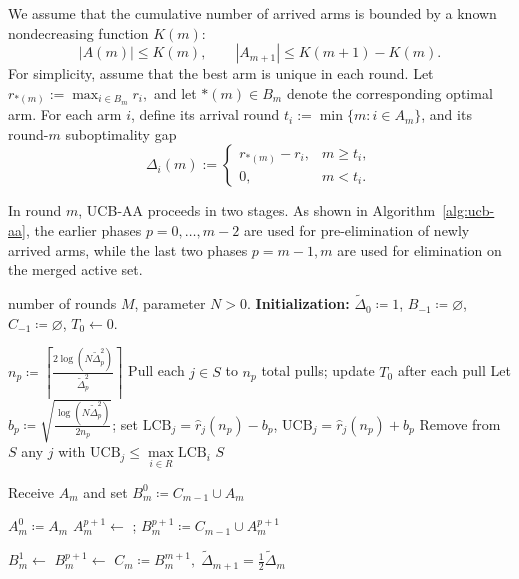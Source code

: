 \documentclass[11pt]{article}
\begin{document}
We assume that the cumulative number of arrived arms is bounded by a known nondecreasing
function \(K(m)\):
\[
|A(m)| \le K(m), \qquad |A_{m+1}| \le K(m+1)-K(m).
\]
For simplicity, assume that the best arm is unique in each round. Let
\(
r_{*(m)}:=\max_{i\in B_m} r_i,
\)
and let \(*(m)\in B_m\) denote the corresponding optimal arm. For each arm \(i\), define
its arrival round $t_i:=\min\{m:i\in A_m\}$, and its round-\(m\) suboptimality gap
\[
\Delta_i(m):=
\begin{cases}
r_{*(m)}-r_i, & m\ge t_i,\\
0, & m<t_i.
\end{cases}
\]




In round $m$, UCB-AA proceeds in two stages. As shown in Algorithm~\ref{alg:ucb-aa}, the earlier phases $p=0,\ldots,m-2$ are used for pre-elimination of newly arrived arms, while the last two phases $p=m-1,m$ are used for elimination on the merged active set. 


\begin{algorithm}[H]
\caption{\textbf{UCB for Arriving Arms (UCB-AA)}}
\label{alg:ucb-aa}
\small
\begin{algorithmic}[1]
\Require number of rounds $M$, parameter $N>0$.
\State \textbf{Initialization:} $\tilde{\Delta}_0 \coloneqq 1$, $B_{-1} \coloneqq \varnothing$, $C_{-1} \coloneqq \varnothing$, $T_0 \gets 0$.

    \State $n_p \coloneqq \left\lceil \frac{2\log(N\tilde{\Delta}_p^2)}{\tilde{\Delta}_p^2} \right\rceil$
    \State Pull each $j\in S$ to $n_p$ total pulls; update $T_0$ after each pull
    \State Let $b_p\coloneqq\sqrt{\frac{\log(N\tilde{\Delta}_p^2)}{2n_p}}$; set $\mathrm{LCB}_j=\hat r_j(n_p)-b_p$, $\mathrm{UCB}_j=\hat r_j(n_p)+b_p$
    \State Remove from $S$ any $j$ with $\mathrm{UCB}_j \le \max\limits_{i\in R}\mathrm{LCB}_i$
    \State \Return $S$
\EndProcedure

    \State Receive $A_m$ and set $B_m^0 \coloneqq C_{m-1}\cup A_m$

        \State $A_m^0 \coloneqq A_m$
            \State $A_m^{p+1} \gets$ ; $B_m^{p+1} \coloneqq C_{m-1}\cup A_m^{p+1}$
        \EndFor
    \EndIf

        \State $B_m^{1} \gets$ 
    \Else
            \State $B_m^{p+1} \gets$ 
        \EndFor
    \EndIf
    \State $C_m \coloneqq B_m^{m+1},\; \tilde{\Delta}_{m+1}=\frac{1}{2}\tilde{\Delta}_{m}$
\EndFor
\end{algorithmic}
\end{algorithm}
\end{document}
